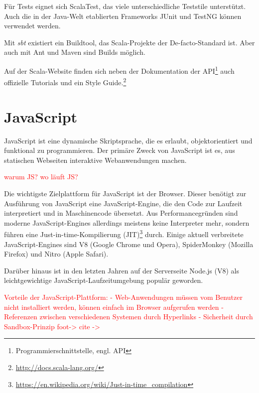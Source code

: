 \documentclass[a4paper, 12pt, hidelinks, listof=totoc, listoftables=totoc, bibliography=totoc]{scrreprt}
\newcommand{\TODO}[1]{\textcolor{red}{#1}\newline}
\begin{document}
Für Tests eignet sich ScalaTest, das viele unterschiedliche Teststile unterstützt. Auch die in der Java-Welt etablierten Frameworks JUnit und TestNG können verwendet werden.

Mit \textit{sbt} existiert ein Buildtool, das Scala-Projekte der De-facto-Standard ist. Aber auch mit Ant und Maven sind Builds möglich.

Auf der Scala-Website finden sich neben der Dokumentation der API\footnote{Programmierschnittstelle, engl. \ac{API}} auch offizielle Tutorials und ein Style Guide.\footnote{\url{http://docs.scala-lang.org/}}



\section{JavaScript}

JavaScript ist eine dynamische Skriptsprache, die es erlaubt, objektorientiert und funktional zu programmieren. Der primäre Zweck von JavaScript ist es, aus statischen Webseiten interaktive Webanwendungen machen\cite[S. 361]{flanagan2011.JDG}.

\TODO{warum JS?}
\TODO{wo läuft JS?}

Die wichtigste Zielplattform für JavaScript ist der Browser. Dieser benötigt zur Ausführung von JavaScript eine JavaScript-Engine, die den Code zur Laufzeit interpretiert und in Maschinencode übersetzt. Aus Performancegründen sind moderne JavaScript-Engines allerdings meistens keine Interpreter mehr, sondern führen eine Just-in-time-Kompilierung (JIT)\footnote{\url{https://en.wikipedia.org/wiki/Just-in-time_compilation}} durch. Einige aktuell verbreitete JavaScript-Engines sind V8 (Google Chrome und Opera), SpiderMonkey (Mozilla Firefox) und Nitro (Apple Safari).



Darüber hinaus ist in den letzten Jahren auf der Serverseite Node.js (V8) als leichtgewichtige JavaScript-Laufzeitumgebung populär geworden.

\TODO{Vorteile der JavaScript-Plattform:}
\TODO{- Web-Anwendungen müssen vom Benutzer nicht installiert werden, können einfach im Browser aufgerufen werden}
\TODO{- Referenzen zwischen verschiedenen Systemen durch Hyperlinks}
\TODO{- Sicherheit durch Sandbox-Prinzip foot-> %
}
\TODO{cite -> %
}
\end{document}
